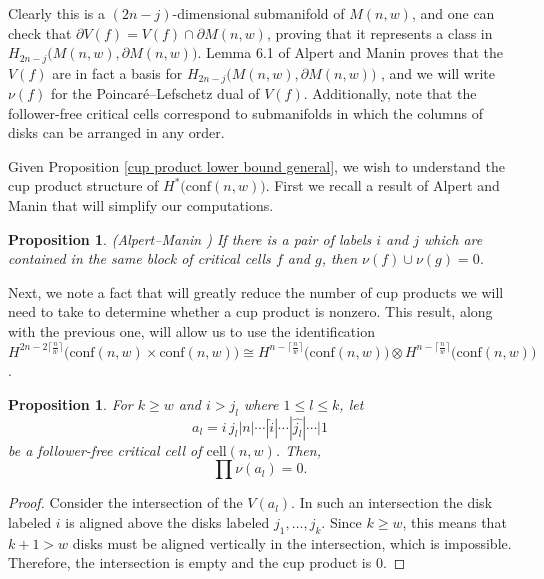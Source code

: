 \documentclass[pagebackref,colorlinks,citecolor=blue,linkcolor=blue,urlcolor=blue,filecolor=blue]{article}
\newtheorem{prop}[thm]{Proposition}
\theoremstyle{definition}\newtheorem{definition}[thm]{Definition}
\theoremstyle{definition}
\begin{document}
Clearly this is a $(2n-j)$-dimensional submanifold of $M(n,w)$, and one can check that $\partial V(f)=V(f)\cap \partial M(n,w)$, proving that it represents a class in $H_{2n-j}\big(M(n,w), \partial M(n,w)\big)$.
Lemma 6.1 of Alpert and Manin proves that the $V(f)$ are in fact a basis for $H_{2n-j}\big(M(n,w), \partial M(n,w)\big)$ \cite[Lemma 6.1]{alpert2021configuration1}, and we will write $\nu(f)$ for the Poincar\'{e}--Lefschetz dual of $V(f)$.
Additionally, note that the follower-free critical cells correspond to submanifolds in which the columns of disks can be arranged in any order.

Given Proposition \ref{cup product lower bound general}, we wish to understand the cup product structure of $H^{*}\big(\text{conf}(n,w)\big)$.
First we recall a result of Alpert and Manin that will simplify our computations.

\begin{prop}\label{no repeats in cup product}
(Alpert--Manin \cite[Proposition 6.2]{alpert2021configuration1}) If there is a pair of labels $i$ and $j$ which are contained in the same block of critical cells $f$ and $g$, then $\nu(f)\cup \nu(g)=0$.
\end{prop}

Next, we note a fact that will greatly reduce the number of cup products we will need to take to determine whether a cup product is nonzero.
This result, along with the previous one, will allow us to use the identification $H^{2n-2\big\lceil\frac{n}{w}\big\rceil}\big(\text{conf}(n,w)\times\text{conf}(n,w)\big)\cong H^{n-\big\lceil\frac{n}{w}\big\rceil}\big(\text{conf}(n,w)\big)\otimes H^{n-\big\lceil\frac{n}{w}\big\rceil}\big(\text{conf}(n,w)\big)$.

\begin{prop}\label{product of more than w-1 terms with same first is trivial}
For $k\ge w$ and $i>j_{l}$ where $1\le l\le k$, let
\[
a_{l}=i\, j_{l}|n|\cdots|\widehat{i}|\cdots|\widehat{j_{l}}|\cdots|1
\]
be a follower-free critical cell of $\text{cell}(n,w)$.
Then,
\[
\prod\nu(a_{l})=0.
\]
\end{prop}

\begin{proof}
Consider the intersection of the $V(a_{l})$. 
In such an intersection the disk labeled $i$ is aligned above the disks labeled $j_{1},\dots, j_{k}$.
Since $k\ge w$, this means that $k+1>w$ disks must be aligned vertically in the intersection, which is impossible. 
Therefore, the intersection is empty and the cup product is $0$.
\end{proof}
\end{document}
